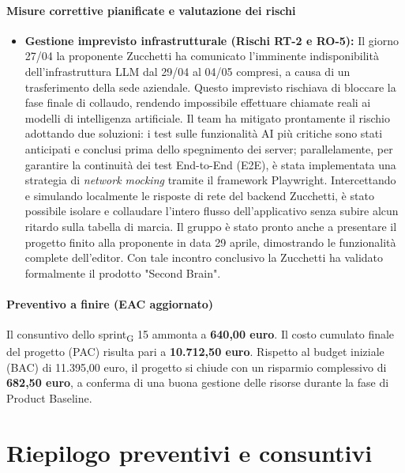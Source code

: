 \documentclass[11pt,a4paper]{article}
\newcommand{\gls}[1]{#1\textsubscript{G}}
\begin{document}
\paragraph{Misure correttive pianificate e valutazione dei rischi}
\begin{itemize}
    \item \textbf{Gestione imprevisto infrastrutturale (Rischi RT-2 e RO-5):} Il giorno 27/04 la proponente Zucchetti ha comunicato l'imminente indisponibilità dell'infrastruttura LLM dal 29/04 al 04/05 compresi, a causa di un trasferimento della sede aziendale. Questo imprevisto rischiava di bloccare la fase finale di collaudo, rendendo impossibile effettuare chiamate reali ai modelli di intelligenza artificiale. Il team ha mitigato prontamente il rischio adottando due soluzioni: i test sulle funzionalità AI più critiche sono stati anticipati e conclusi prima dello spegnimento dei server; parallelamente, per garantire la continuità dei test End-to-End (E2E), è stata implementata una strategia di \textit{network mocking} tramite il framework Playwright. Intercettando e simulando localmente le risposte di rete del backend Zucchetti, è stato possibile isolare e collaudare l'intero flusso dell'applicativo senza subire alcun ritardo sulla tabella di marcia. Il gruppo è stato pronto anche a presentare il progetto finito alla proponente in data 29 aprile, dimostrando le funzionalità complete dell'editor. Con tale incontro conclusivo la Zucchetti ha validato formalmente il prodotto "Second Brain".
\end{itemize}

\paragraph{Preventivo a finire (EAC aggiornato)}
Il consuntivo dello \gls{sprint} 15 ammonta a \textbf{640,00 euro}.
Il costo cumulato finale del progetto (PAC) risulta pari a \textbf{10.712,50 euro}. 
Rispetto al budget iniziale (BAC) di 11.395,00 euro, il progetto si chiude con un risparmio complessivo di \textbf{682,50 euro}, a conferma di una buona gestione delle risorse durante la fase di Product Baseline.


\newpage
\section{Riepilogo preventivi e consuntivi}
\end{document}
